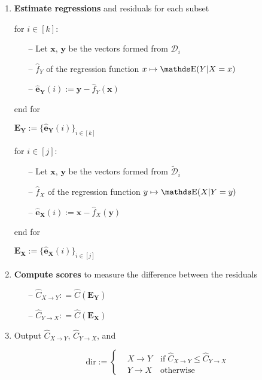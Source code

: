 \begin{algorithm}[H]
\begin{enumerate}
        \item \textbf{Estimate regressions} and residuals for each subset
        
        for $i \in [k]:$

        \begin{itemize}
            \item[--] Let $\mathbf{x}$, $\mathbf{y}$ be the vectors formed from $\mathcal{D}_i$
            \item[--] $\hat{f}_Y$ of the regression function $x \mapsto \E(Y | X=x)$
            \item[--] $ \mathbf{\hat{e}_{Y}}(i) := \mathbf{y} - \hat{f}_Y(\mathbf{x})$
        \end{itemize}

        end for

        $\mathbf{E_Y} := \{ \mathbf{\hat{e}_{Y}}(i) \}_{i \in [k]} $

        for $i \in [j]:$

        \begin{itemize}
            \item[--] Let $\mathbf{x}$, $\mathbf{y}$ be the vectors formed from $\tilde{\mathcal{D}}_i$
            \item[--] $\hat{f}_X$ of the regression function $y \mapsto \E(X | Y=y)$
            \item[--] $ \mathbf{\hat{e}_{X}}(i) := \mathbf{x} - \hat{f}_X(\mathbf{y})$
        \end{itemize}

        end for

        $\mathbf{E_X} := \{ \mathbf{\hat{e}_{X}}(i) \}_{i \in [j]} $

        \item \textbf{Compute scores} to measure the difference between the residuals
        \begin{itemize}
            \item[--] $\hat{C}_{X \rightarrow Y}: = \hat{C}( \mathbf{E_Y} )$ 
            \item[--] $\hat{C}_{Y \rightarrow X}: = \hat{C}( \mathbf{E_X} )$
        \end{itemize}        

        \item Output $\hat{C}_{X \rightarrow Y}$, $\hat{C}_{Y \rightarrow X}$, and
        
        \[ 
        \text{dir} :=  
         \begin{cases} 
            & X \rightarrow Y \quad \text{if} \; \hat{C}_{X \rightarrow Y} \leq \hat{C}_{Y \rightarrow X}\\
            & Y \rightarrow X \quad \text{otherwise}
         \end{cases}
        \]
        
    \end{enumerate}

  \label{alg:twin_test}
  \end{algorithm}


